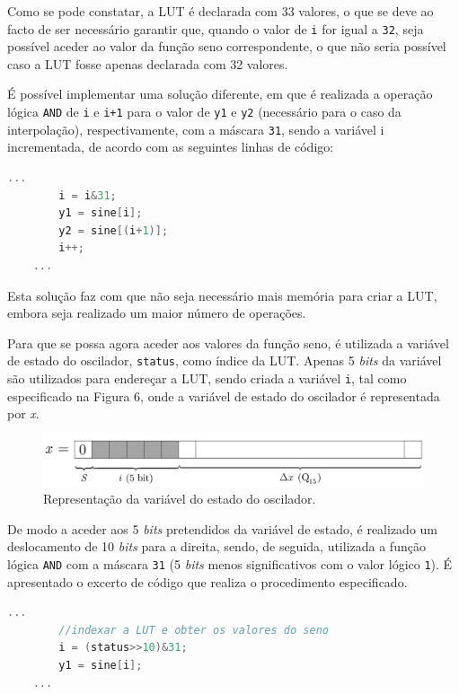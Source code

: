 \documentclass[11pt]{article}
\numberwithin{equation}{section}
\begin{document}
Como se pode constatar, a LUT é declarada com 33 valores, o que se deve ao facto de ser necessário garantir que, quando o valor de \texttt{i} for igual a \texttt{32}, seja possível aceder ao valor da função seno correspondente, o que não seria possível caso a LUT fosse apenas declarada com 32 valores.
 
É possível implementar uma solução diferente, em que é realizada a operação lógica \texttt{AND} de \texttt{i} e \texttt{i+1} para o valor de \texttt{y1} e \texttt{y2} (necessário para o caso  da interpolação), respectivamente, com a máscara \texttt{31}, sendo a variável i incrementada,  de acordo com as seguintes linhas de código:

\begin{lstlisting}[language=C]
	...
		i = i&31;
		y1 = sine[i];
		y2 = sine[(i+1)];
		i++;
	...
\end{lstlisting}

Esta solução faz com que não seja necessário mais memória para criar a LUT, embora seja realizado um maior número de operações.  

Para que se possa agora aceder aos valores da função seno, é utilizada a variável de estado do oscilador, \texttt{status}, como índice da LUT. Apenas 5 \textit{bits} da variável são utilizados para endereçar a LUT, sendo criada a variável \texttt{i}, tal como especificado na Figura 6, onde a variável de estado do oscilador é representada por \textit{x}.

\begin{figure}[H]
	\centering
	\includegraphics[keepaspectratio=true, scale=0.27]{teoricas/seno}
	\caption{Representação da variável do estado do oscilador.}
	\vspace{-0.8em}
	\label{fig:variavelestado}
\end{figure}

De modo a aceder aos 5 \textit{bits} pretendidos da variável de estado, é realizado um deslocamento de 10 \textit{bits} para a direita, sendo, de seguida, utilizada a função lógica \texttt{AND} com a máscara \texttt{31} (5 \textit{bits} menos significativos com o valor lógico \texttt{1}). É apresentado o excerto de código que realiza o procedimento especificado. 

\begin{lstlisting}[language=C]
	...
		//indexar a LUT e obter os valores do seno
		i = (status>>10)&31;
		y1 = sine[i]; 
	...
\end{lstlisting}
\end{document}
